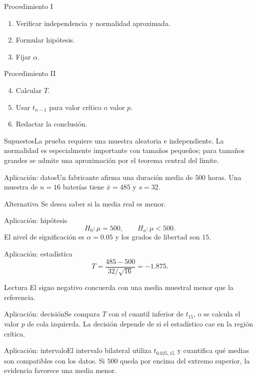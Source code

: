 \documentclass[10pt,aspectratio=169]{beamer}
\begin{document}
\begin{frame}{Procedimiento I}\small\begin{enumerate}\item Verificar independencia y normalidad aproximada.\item Formular hipótesis.\item Fijar $\alpha$.\end{enumerate}\end{frame}
\begin{frame}{Procedimiento II}\small\begin{enumerate}\setcounter{enumi}{3}\item Calcular $T$.\item Usar $t_{n-1}$ para valor crítico o valor $p$.\item Redactar la conclusión.\end{enumerate}\end{frame}
\begin{frame}{Supuestos}\small La prueba requiere una muestra aleatoria e independiente. La normalidad es especialmente importante con tamaños pequeños; para tamaños grandes se admite una aproximación por el teorema central del límite.\end{frame}
\begin{frame}{Aplicación: datos}\small Un fabricante afirma una duración media de $500$ horas. Una muestra de $n=16$ baterías tiene $\bar x=485$ y $s=32$.\begin{block}{Alternativa} Se desea saber si la media real es menor.\end{block}\end{frame}
\begin{frame}{Aplicación: hipótesis}\small\[H_0:\mu=500,\qquad H_a:\mu<500.\]El nivel de significación es $\alpha=0.05$ y los grados de libertad son $15$.\end{frame}
\begin{frame}{Aplicación: estadística}\small\[T=\frac{485-500}{32/\sqrt{16}}=-1.875.\]\begin{block}{Lectura} El signo negativo concuerda con una media muestral menor que la referencia.\end{block}\end{frame}
\begin{frame}{Aplicación: decisión}\small Se compara $T$ con el cuantil inferior de $t_{15}$, o se calcula el valor $p$ de cola izquierda. La decisión depende de si el estadístico cae en la región crítica.\end{frame}
\begin{frame}{Aplicación: intervalo}\small El intervalo bilateral utiliza $t_{0.025,15}$ y cuantifica qué medias son compatibles con los datos. Si $500$ queda por encima del extremo superior, la evidencia favorece una media menor.\end{frame}
\end{document}
